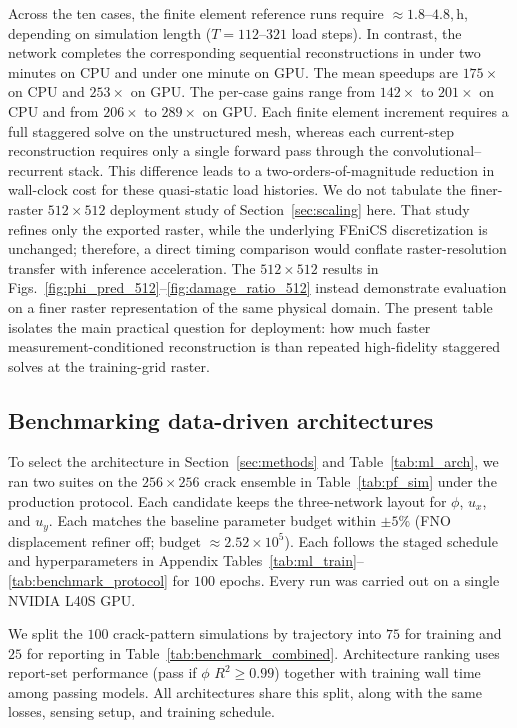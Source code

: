 \documentclass[10pt]{article}
\theoremstyle{definition}
\begin{document}
Across the ten cases, the finite element reference runs require $\approx1.8$--$4.8,\mathrm{h}$, depending on simulation length ($T=112$--$321$ load steps).
%
In contrast, the network completes the corresponding sequential reconstructions in under two minutes on CPU and under one minute on GPU.
%
The mean speedups are $175\times$ on CPU and $253\times$ on GPU.
%
The per-case gains range from $142\times$ to $201\times$ on CPU and from $206\times$ to $289\times$ on GPU.
%
Each finite element increment requires a full staggered solve on the unstructured mesh, whereas each current-step reconstruction requires only a single forward pass through the convolutional--recurrent stack.
%
This difference leads to a two-orders-of-magnitude reduction in wall-clock cost for these quasi-static load histories.
%
We do not tabulate the finer-raster $512\times512$ deployment study of Section~\ref{sec:scaling} here.
%
That study refines only the exported raster, while the underlying FEniCS discretization is unchanged; therefore, a direct timing comparison would conflate raster-resolution transfer with inference acceleration.
%
The $512\times512$ results in Figs.~\ref{fig:phi_pred_512}--\ref{fig:damage_ratio_512} instead demonstrate evaluation on a finer raster representation of the same physical domain.
%
The present table isolates the main practical question for deployment: how much faster measurement-conditioned reconstruction is than repeated high-fidelity staggered solves at the training-grid raster.


\subsection{Benchmarking data-driven architectures}\label{sec:architecture_benchmark}

To select the architecture in Section~\ref{sec:methods} and Table~\ref{tab:ml_arch}, we ran two suites on the $256\times256$ crack ensemble in Table~\ref{tab:pf_sim} under the production protocol.
%
Each candidate keeps the three-network layout for $\phi$, $u_x$, and $u_y$.
%
Each matches the baseline parameter budget within $\pm5\%$ (FNO displacement refiner off; budget $\approx2.52\times10^{5}$).
%
Each follows the staged schedule and hyperparameters in Appendix Tables~\ref{tab:ml_train}--\ref{tab:benchmark_protocol} for $100$ epochs.
%
Every run was carried out on a single NVIDIA L40S GPU.

We split the $100$ crack-pattern simulations by trajectory into $75$ for training and $25$ for reporting in Table~\ref{tab:benchmark_combined}.
%
Architecture ranking uses report-set performance (pass if $\phi$ $R^2\ge0.99$) together with training wall time among passing models.
%
All architectures share this split, along with the same losses, sensing setup, and training schedule.
\end{document}
